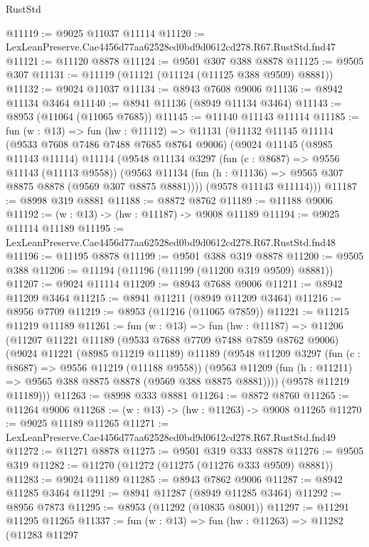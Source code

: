 \begin{lexlean}{RustStd}
\begin{coremodule}
@11119 := @9025 @11037 @11114
@11120 := LexLeanPreserve.Cae4456d77aa62528ed0bd9d0612cd278.R67.RustStd.fnd47
@11121 := @11120 @8878
@11124 := @9501 @307 @388 @8878
@11125 := @9505 @307
@11131 := @11119 (@11121 (@11124 (@11125 @388 @9509) @8881))
@11132 := @9024 @11037
@11134 := @8943 @7608 @9006
@11136 := @8942 @11134 @3464
@11140 := @8941 @11136 (@8949 @11134 @3464)
@11143 := @8953 (@11064 (@11065 @7685))
@11145 := @11140 @11143 @11114
@11185 := fun (w : @13) =>
  fun (hw : @11112) =>
  @11131
    (@11132
      @11145
      @11114
      (@9533 @7608 @7486 @7488 @7685 @8764 @9006)
      (@9024
        @11145
        (@8985 @11143 @11114)
        @11114
        (@9548
          @11134
          @3297
          (fun (c : @8687) => @9556 @11143 (@11113 @9558))
          (@9563 @11134 (fun (h : @11136) => @9565 @307 @8875 @8878 (@9569 @307 @8875 @8881))))
        (@9578 @11143 @11114)))
@11187 := @8998 @319 @8881
@11188 := @8872 @8762
@11189 := @11188 @9006
@11192 := (w : @13) -> (hw : @11187) -> @9008 @11189
@11194 := @9025 @11114 @11189
@11195 := LexLeanPreserve.Cae4456d77aa62528ed0bd9d0612cd278.R67.RustStd.fnd48
@11196 := @11195 @8878
@11199 := @9501 @388 @319 @8878
@11200 := @9505 @388
@11206 := @11194 (@11196 (@11199 (@11200 @319 @9509) @8881))
@11207 := @9024 @11114
@11209 := @8943 @7688 @9006
@11211 := @8942 @11209 @3464
@11215 := @8941 @11211 (@8949 @11209 @3464)
@11216 := @8956 @7709
@11219 := @8953 (@11216 (@11065 @7859))
@11221 := @11215 @11219 @11189
@11261 := fun (w : @13) =>
  fun (hw : @11187) =>
  @11206
    (@11207
      @11221
      @11189
      (@9533 @7688 @7709 @7488 @7859 @8762 @9006)
      (@9024
        @11221
        (@8985 @11219 @11189)
        @11189
        (@9548
          @11209
          @3297
          (fun (c : @8687) => @9556 @11219 (@11188 @9558))
          (@9563 @11209 (fun (h : @11211) => @9565 @388 @8875 @8878 (@9569 @388 @8875 @8881))))
        (@9578 @11219 @11189)))
@11263 := @8998 @333 @8881
@11264 := @8872 @8760
@11265 := @11264 @9006
@11268 := (w : @13) -> (hw : @11263) -> @9008 @11265
@11270 := @9025 @11189 @11265
@11271 := LexLeanPreserve.Cae4456d77aa62528ed0bd9d0612cd278.R67.RustStd.fnd49
@11272 := @11271 @8878
@11275 := @9501 @319 @333 @8878
@11276 := @9505 @319
@11282 := @11270 (@11272 (@11275 (@11276 @333 @9509) @8881))
@11283 := @9024 @11189
@11285 := @8943 @7862 @9006
@11287 := @8942 @11285 @3464
@11291 := @8941 @11287 (@8949 @11285 @3464)
@11292 := @8956 @7873
@11295 := @8953 (@11292 (@10835 @8001))
@11297 := @11291 @11295 @11265
@11337 := fun (w : @13) =>
  fun (hw : @11263) =>
  @11282
    (@11283
      @11297

\end{coremodule}
\end{lexlean}
